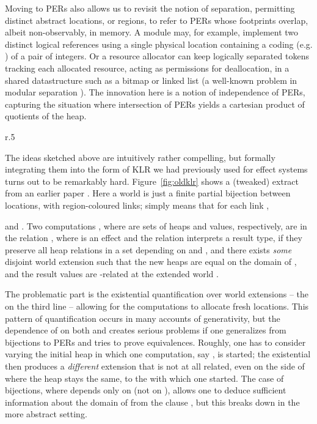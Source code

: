 \documentclass[orivec]{llncs}
\begin{document}
Moving to PERs also allows us to revisit the notion of separation,
permitting distinct abstract locations, or regions, to refer to PERs
whose footprints overlap, albeit non-observably, in memory. A module
may, for example, implement two distinct logical references using a
single physical location containing a coding (e.g. ) of a pair
 of integers. Or a resource allocator can keep logically
separated tokens tracking each allocated resource, acting as
permissions for deallocation, in a shared datastructure such as a
bitmap or linked list (a well-known problem in modular separation
\cite{krishnaswami:superficially}). The innovation here is a notion of independence of PERs,
capturing the situation where intersection of PERs yields a cartesian
product of quotients of the heap.

\begin{wrapfigure}{r}{.5\textwidth}
\vspace{-3mm}

\vspace{-2mm}
\caption{Earlier Kripke logical relation, extract}
\label{fig:oldklr}
\vspace{-9mm}
\end{wrapfigure}
The ideas sketched above are intuitively rather compelling, but
formally integrating them into the form of KLR we had previously used
for effect systems turns out to be remarkably
hard. Figure~\ref{fig:oldklr} shows a (tweaked) extract from an earlier
paper \cite{DBLP:conf/ppdp/BentonKBH07}. Here a world  is just a finite partial bijection between
locations, with region-coloured links; 
simply means that for each link ,

and .
Two
computations , where  are
sets of heaps and values, respectively, are in the relation
, where  is an effect and the relation  interprets a
result type, if they preserve all heap relations  in a set
depending on  and , and there exists \emph{some}
disjoint world extension  such that the new heaps are equal on
the domain of , and the result values are -related at the
extended world . 



The problematic part
is the existential quantification over world extensions -- the
 on the third line -- allowing for the computations
to allocate fresh locations.
This pattern of
quantification occurs in many accounts of generativity, but
the dependence of  on both  and  creates serious problems
if one generalizes from bijections to PERs
and tries to prove equivalences.
Roughly, one has to consider varying the initial heap in
which one computation, say , is started; the
existential then produces a \emph{different} extension 
that is
not at all related, even on the side of  where the
heap stays the same, to the  with which one started. The
case of bijections, where  depends only on
 (not on ), allows one to deduce sufficient information
about the domain of  from the clause ,
but this breaks down in the more abstract setting.
\end{document}
